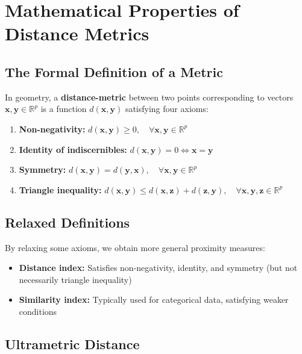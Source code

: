 \documentclass[11pt]{article}
\begin{document}
\section{Mathematical Properties of Distance Metrics}

\subsection{The Formal Definition of a Metric}

In geometry, a \textbf{distance-metric} between two points corresponding to vectors $\mathbf{x}, \mathbf{y} \in \mathbb{R}^p$ is a function $d(\mathbf{x}, \mathbf{y})$ satisfying four axioms:

\begin{enumerate}
    \item \textbf{Non-negativity:} $d(\mathbf{x}, \mathbf{y}) \geq 0, \quad \forall \mathbf{x}, \mathbf{y} \in \mathbb{R}^p$
    
    \item \textbf{Identity of indiscernibles:} $d(\mathbf{x}, \mathbf{y}) = 0 \Leftrightarrow \mathbf{x} = \mathbf{y}$
    
    \item \textbf{Symmetry:} $d(\mathbf{x}, \mathbf{y}) = d(\mathbf{y}, \mathbf{x}), \quad \forall \mathbf{x}, \mathbf{y} \in \mathbb{R}^p$
    
    \item \textbf{Triangle inequality:} $d(\mathbf{x}, \mathbf{y}) \leq d(\mathbf{x}, \mathbf{z}) + d(\mathbf{z}, \mathbf{y}), \quad \forall \mathbf{x}, \mathbf{y}, \mathbf{z} \in \mathbb{R}^p$
\end{enumerate}

\subsection{Relaxed Definitions}

By relaxing some axioms, we obtain more general proximity measures:

\begin{itemize}
    \item \textbf{Distance index:} Satisfies non-negativity, identity, and symmetry (but not necessarily triangle inequality)
    \item \textbf{Similarity index:} Typically used for categorical data, satisfying weaker conditions
\end{itemize}

\subsection{Ultrametric Distance}
\end{document}
